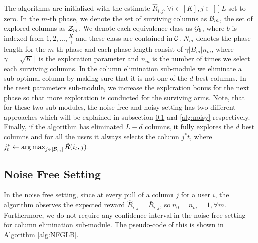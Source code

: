 The algorithms are initialized with the estimate $\hat{R}_{i,j}, \forall i\in[K], j\in[]L$ set to zero. In the $m$-th phase, we denote the set of surviving columns as $\mathcal{B}_m$, the set of explored columns as $\mathcal{Z}_m$. We denote each equivalence class as $\mathcal{G}_b$, where $b$ is indexed from $1,2,\ldots , \frac{K}{\gamma}$ and these class are contained in $\mathcal{C}$.  $N_m$ denotes the phase length for the $m$-th phase and each phase length consist of $\gamma |B_m| n_m $, where $ \gamma = \lceil\sqrt{K} \rceil $ is the exploration parameter and $ n_m $ is the number of times we select each surviving columns. In the column elimination sub-module we eliminate a sub-optimal column by making sure that it is not one of the $d$-best columns. In the reset parameters sub-module, we increase the exploration bonus for the next phase so that more exploration is conducted for the surviving arms. Note, that for these two sub-modules, the noise free and noisy setting has two different approaches which will be explained in subsection \ref{alg:noisefree} and \ref{alg:noisy} respectively. Finally, if the algorithm has eliminated $L-d$ columns, it fully explores the $d$ best columns and for all the users it always selects the column $j^*t$, where $j_t^* \leftarrow \mathop{\rm arg\,max}_{j\in[\mathcal{B}_m]} {\hat{R}(i_t,j)}$.

\subsection{Noise Free Setting}
\label{alg:noisefree}

In the noise free setting, since at every pull of a column $j$ for a user $i$, the algorithm observes the expected reward $\hat{R}_{i,j} = \bar{R}_{i,j}$, so $n_0 =  n_m = 1, \forall m$. Furthermore, we do not require any confidence interval in the noise free setting for column elimination sub-module. The pseudo-code of this is shown in Algorithm \ref{alg:NFGLB}.

